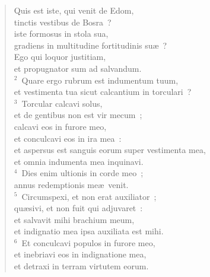 \begin{flushleft}\begin{verse}\vspace{-19pt}\hspace{6pt}Quis est iste, qui venit de Edom,\\\hspace{6pt} tinctis vestibus de Bosra~?\\ iste formosus in stola sua,\\ gradiens in multitudine fortitudinis su\ae~?\\ Ego qui loquor justitiam,\\ et propugnator sum ad salvandum.\\
${}^{2}$~Quare ergo rubrum est indumentum tuum,\\ et vestimenta tua sicut calcantium in torculari~?\\
${}^{3}$~Torcular calcavi solus,\\ et de gentibus non est vir mecum~;\\ calcavi eos in furore meo,\\ et conculcavi eos in ira mea~:\\ et aspersus est sanguis eorum super vestimenta mea,\\ et omnia indumenta mea inquinavi.\\
${}^{4}$~Dies enim ultionis in corde meo~;\\ annus redemptionis me\ae\ venit.\\
${}^{5}$~Circumspexi, et non erat auxiliator~;\\ qu\ae sivi, et non fuit qui adjuvaret~:\\ et salvavit mihi brachium meum,\\ et indignatio mea ipsa auxiliata est mihi.\\
${}^{6}$~Et conculcavi populos in furore meo,\\ et inebriavi eos in indignatione mea,\\ et detraxi in terram virtutem eorum.\end{verse}\end{flushleft}


